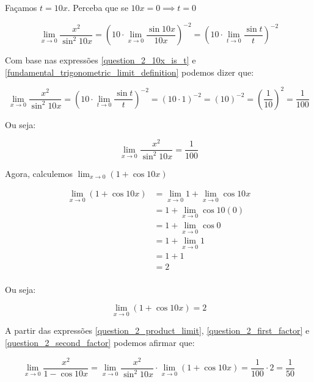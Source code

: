 \documentclass{article}
\begin{document}
Façamos \(t = 10x\). Perceba que se \(10x = 0 \implies t = 0 \)

\begin{equation} \label{question_2_10x_is_t}
    \lim_{x \to 0} \frac{x^2}{\sin^2 10x}
    =  \left( 10 \cdot \lim_{x \to 0} \frac{\sin 10x}{10x}\right)^{-2}
    =  \left( 10 \cdot \lim_{t \to 0} \frac{\sin t}{t}\right)^{-2}
\end{equation}

Com base nas expressões \ref{question_2_10x_is_t} e \ref{fundamental_trigonometric_limit_definition}
podemos dizer que:

\begin{equation*}
    \lim_{x \to 0} \frac{x^2}{\sin^2 10x}
    =  \left( 10 \cdot \lim_{t \to 0} \frac{\sin t}{t}\right)^{-2}
    =  (10 \cdot 1)^{-2}
    =  (10)^{-2}
    = \left(\frac{1}{10}\right)^2
    = \frac{1}{100}
\end{equation*}

Ou seja:

\begin{equation} \label{question_2_first_factor}
    \lim_{x \to 0} \frac{x^2}{\sin^2 10x} = \frac{1}{100}
\end{equation}


Agora, calculemos \(\lim_{x \to 0} (1 + \cos 10x)\)

\begin{align*}
    \lim_{x \to 0} (1 + \cos 10x)
     & =  \lim_{x \to 0} 1 + \lim_{x \to 0} \cos 10x \\
     & =  1 + \lim_{x \to 0} \cos 10(0)              \\
     & =  1 + \lim_{x \to 0} \cos 0                  \\
     & =  1 + \lim_{x \to 0} 1                       \\
     & =  1 + 1                                      \\
     & =  2                                          \\
\end{align*}

Ou seja:

\begin{equation} \label{question_2_second_factor}
    \lim_{x \to 0} (1 + \cos 10x) = 2
\end{equation}

A partir das expressões \ref{question_2_product_limit}, \ref{question_2_first_factor} e \ref{question_2_second_factor} podemos afirmar que:

\[
    \lim_{x \to 0} \frac{x^2}{1 - \cos 10x}
    =  \lim_{x \to 0} \frac{x^2}{\sin^2 10x} \cdot \lim_{x \to 0}(1 + \cos 10x)
    = \frac{1}{100} \cdot 2
    = \frac{1}{50}
\]
\end{document}
